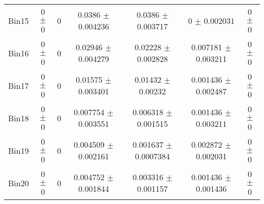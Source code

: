 \begin{tabular}{@{\extracolsep{4pt}}lcccccc@{}}
     Bin15 & 0 $\pm$ 0 & 0 & 0.0386 $\pm$ 0.004236 & 0.0386 $\pm$ 0.003717 & 0 $\pm$ 0.002031 & 0 $\pm$ 0 \\ 
     Bin16 & 0 $\pm$ 0 & 0 & 0.02946 $\pm$ 0.004279 & 0.02228 $\pm$ 0.002828 & 0.007181 $\pm$ 0.003211 & 0 $\pm$ 0 \\ 
     Bin17 & 0 $\pm$ 0 & 0 & 0.01575 $\pm$ 0.003401 & 0.01432 $\pm$ 0.00232 & 0.001436 $\pm$ 0.002487 & 0 $\pm$ 0 \\ 
     Bin18 & 0 $\pm$ 0 & 0 & 0.007754 $\pm$ 0.003551 & 0.006318 $\pm$ 0.001515 & 0.001436 $\pm$ 0.003211 & 0 $\pm$ 0 \\ 
     Bin19 & 0 $\pm$ 0 & 0 & 0.004509 $\pm$ 0.002161 & 0.001637 $\pm$ 0.0007384 & 0.002872 $\pm$ 0.002031 & 0 $\pm$ 0 \\ 
     Bin20 & 0 $\pm$ 0 & 0 & 0.004752 $\pm$ 0.001844 & 0.003316 $\pm$ 0.001157 & 0.001436 $\pm$ 0.001436 & 0 $\pm$ 0 \\ 
\hline\hline
  \end{tabular}
